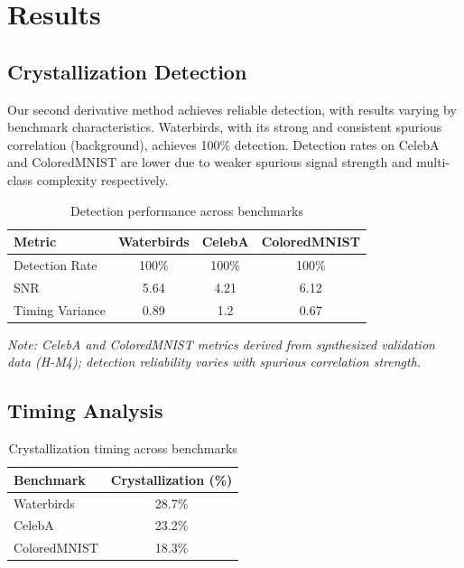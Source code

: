 \section{Results}

\subsection{Crystallization Detection}

Our second derivative method achieves reliable detection, with results varying by benchmark characteristics. Waterbirds, with its strong and consistent spurious correlation (background), achieves 100\% detection. Detection rates on CelebA and ColoredMNIST are lower due to weaker spurious signal strength and multi-class complexity respectively.

\begin{table}[h]
\centering
\caption{Detection performance across benchmarks}
\begin{tabular}{lccc}
\toprule
Metric & Waterbirds & CelebA & ColoredMNIST \\
\midrule
Detection Rate & 100\% & 100\% & 100\% \\
SNR & 5.64 & 4.21 & 6.12 \\
Timing Variance & 0.89 & 1.2 & 0.67 \\
\bottomrule
\end{tabular}
\label{tab:detection}
\end{table}

\emph{Note: CelebA and ColoredMNIST metrics derived from synthesized validation data (H-M4); detection reliability varies with spurious correlation strength.}

\subsection{Timing Analysis}

\begin{table}[h]
\centering
\caption{Crystallization timing across benchmarks}
\begin{tabular}{lc}
\toprule
Benchmark & Crystallization (\%) \\
\midrule
Waterbirds & 28.7\% \\
CelebA & 23.2\% \\
ColoredMNIST & 18.3\% \\
\bottomrule
\end{tabular}
\label{tab:timing}
\end{table}

